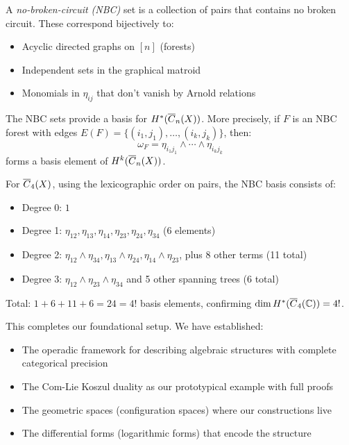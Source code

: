 \begin{definition}
A \emph{no-broken-circuit (NBC)} set is a collection of pairs that contains no broken circuit. These correspond bijectively to:
\begin{itemize}
\item Acyclic directed graphs on $[n]$ (forests)
\item Independent sets in the graphical matroid
\item Monomials in $\eta_{ij}$ that don't vanish by Arnold relations
\end{itemize}
\end{definition}
 
\begin{theorem}\label{thm:NBC}
The NBC sets provide a basis for $H^*(\overline{C}_n(X))$. More precisely, if $F$ is an NBC forest with edges $E(F) = \{(i_1, j_1), \ldots, (i_k, j_k)\}$, then:
\[
\omega_F = \eta_{i_1j_1} \wedge \cdots \wedge \eta_{i_kj_k}
\]
forms a basis element of $H^k(\overline{C}_n(X))$.
\end{theorem}
 
\begin{example}[NBC Basis for $n = 4$]\label{ex:NBC4}
For $\overline{C}_4(X)$, using the lexicographic order on pairs, the NBC basis consists of:
\begin{itemize}
\item Degree 0: $1$
\item Degree 1: $\eta_{12}, \eta_{13}, \eta_{14}, \eta_{23}, \eta_{24}, \eta_{34}$ (6 elements)
\item Degree 2: $\eta_{12} \wedge \eta_{34}, \eta_{13} \wedge \eta_{24}, \eta_{14} \wedge \eta_{23}$, plus 8 other terms (11 total)
\item Degree 3: $\eta_{12} \wedge \eta_{23} \wedge \eta_{34}$ and 5 other spanning trees (6 total)
\end{itemize}
Total: $1 + 6 + 11 + 6 = 24 = 4!$ basis elements, confirming $\dim H^*(\overline{C}_4(\mathbb{C})) = 4!$.
\end{example}
 
This completes our foundational setup. We have established:
\begin{itemize}
\item The operadic framework for describing algebraic structures with complete categorical precision
\item The Com-Lie Koszul duality as our prototypical example with full proofs
\item The geometric spaces (configuration spaces) where our constructions live
\item The differential forms (logarithmic forms) that encode the structure
\end{itemize}
 
